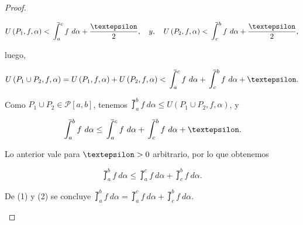 \begin{proof}
\begin{itemize}
\begin{equation*}
  U\left(P_1,f,\alpha\right)<\upint_a^c f\ d\alpha+\frac{\text{\textepsilon}}{2},\quad y,\quad U\left(P_2,f,\alpha\right)<\upint_c^b f\ d\alpha+\frac{\text{\textepsilon}}{2},
\end{equation*}

luego,

\begin{equation*}
  U\left(P_1\cup P_2,f,\alpha\right) = U\left(P_1,f,\alpha\right)+U\left(P_2,f,\alpha\right) < \upint_a^c f\ d\alpha + \upint_c^b f\ d\alpha + \text{\textepsilon}.
\end{equation*}

Como $P_1\cup P_2\in\mathcal{P}\left[a,b\right]$, tenemos $\upint_a^b f\ d\alpha \leq U\left(P_1\cup P_2,f,\alpha\right)$, y

\begin{equation*}
  \upint_a^b f\ d\alpha \leq \upint_a^c f\ d\alpha + \upint_c^b f\ d\alpha +\text{\textepsilon}.
\end{equation*}

Lo anterior vale para $\text{\textepsilon}>0$ arbitrario, por lo que obtenemos

\setcounter{equation}{1}
\begin{equation}
  \upint_a^b f\ d\alpha \leq \upint_a^c f\ d\alpha + \upint_c^b f\ d\alpha.
\end{equation}

De (1) y (2) se concluye $\upint_a^b f\ d\alpha = \upint_a^c f\ d\alpha + \upint_c^b f\ d\alpha.$

\end{itemize}

\end{proof}

